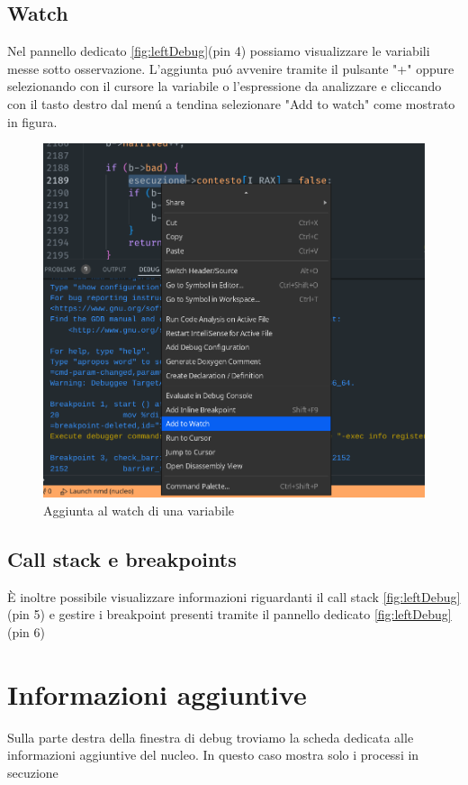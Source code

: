 \subsection*{Watch}
Nel pannello dedicato \ref*{fig:leftDebug}(pin 4) possiamo visualizzare le variabili messe sotto osservazione. L'aggiunta puó avvenire tramite il pulsante "+" oppure selezionando con il cursore la variabile o l'espressione da analizzare e cliccando con il tasto destro dal menú a tendina selezionare "Add to watch" come mostrato in figura.

\begin{figure}[H]
    \centering
    \includegraphics[width=0.8\columnwidth]{images/addWatch.png}
    \caption{Aggiunta al watch di una variabile}
    \label{fig:watchvariabili}
\end{figure}

\subsection*{Call stack e breakpoints}
È inoltre possibile visualizzare informazioni riguardanti il call stack \ref*{fig:leftDebug}(pin 5) e gestire i breakpoint presenti tramite il pannello dedicato \ref*{fig:leftDebug}(pin 6)

\section{Informazioni aggiuntive}

Sulla parte destra della finestra di debug troviamo la scheda dedicata alle informazioni aggiuntive del nucleo. In questo caso
mostra solo i processi in secuzione 

